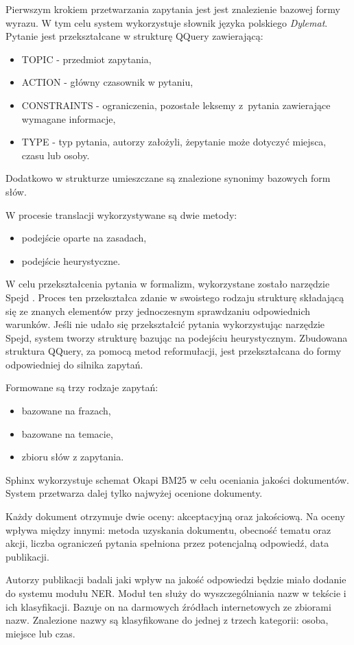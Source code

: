 Pierwszym krokiem przetwarzania zapytania jest jest znalezienie bazowej formy wyrazu. W tym celu system wykorzystuje słownik języka polskiego \textit{Dylemat}. Pytanie jest przekształcane w strukturę QQuery zawierającą:
\begin{itemize}
	\item TOPIC - przedmiot zapytania,
	\item ACTION - główny czasownik w pytaniu,
	\item CONSTRAINTS - ograniczenia, pozostałe leksemy z~pytania zawierające wymagane informacje,
	\item TYPE - typ pytania, autorzy założyli, żepytanie może dotyczyć miejsca, czasu lub osoby.
\end{itemize}
Dodatkowo w strukturze umieszczane są znalezione synonimy bazowych form słów.

W procesie translacji wykorzystywane są dwie metody: 
\begin{itemize}
	\item podejście oparte na zasadach, 
	\item podejście heurystyczne.
\end{itemize}
W celu przekształcenia pytania w formalizm, wykorzystane zostało narzędzie Spejd \cite{spejd}. Proces ten przekształca zdanie w swoistego rodzaju strukturę składającą się ze znanych elementów przy jednoczesnym sprawdzaniu odpowiednich warunków. Jeśli nie udało się przekształcić pytania wykorzystując narzędzie Spejd, system tworzy strukturę bazując na podejściu heurystycznym. Zbudowana struktura QQuery, za pomocą metod reformułacji, jest przekształcana do formy odpowiedniej do silnika zapytań.

Formowane są trzy rodzaje zapytań:
\begin{itemize}
	\item bazowane na frazach,
	\item bazowane na temacie,
	\item zbioru słów z zapytania.
\end{itemize}

Sphinx wykorzystuje schemat Okapi BM25 w celu oceniania jakości dokumentów. System przetwarza dalej tylko najwyżej ocenione dokumenty.

Każdy dokument otrzymuje dwie oceny: akceptacyjną oraz jakościową. Na oceny wpływa między innymi: metoda uzyskania dokumentu, obecność tematu oraz akcji, liczba ograniczeń pytania spełniona przez potencjalną odpowiedź, data publikacji.

Autorzy publikacji \cite{polishQAS} badali jaki wpływ na jakość odpowiedzi będzie miało dodanie do systemu modułu NER. Moduł ten służy do wyszczególniania nazw w tekście i ich klasyfikacji. Bazuje on na darmowych źródłach internetowych ze zbiorami nazw. Znalezione nazwy są klasyfikowane do jednej z trzech kategorii: osoba, miejsce lub czas.

